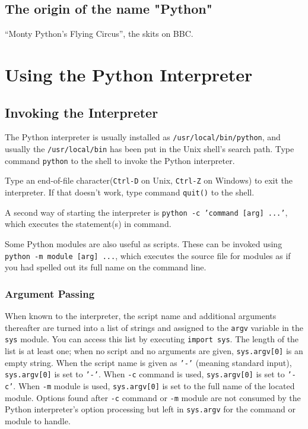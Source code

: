 \documentclass[UTF8]{article}
\begin{document}
\subsection{The origin of the name "Python"}
“Monty Python’s Flying Circus”, the skits on BBC.

\section{Using the Python Interpreter}
\subsection{Invoking the Interpreter}
The Python interpreter is usually installed as \texttt{/usr/local/bin/python}, and usually the
\texttt{/usr/local/bin} has been put in the Unix shell’s search path. Type command \texttt{python}
to the shell to invoke the Python interpreter.

Type an end-of-file character(\texttt{Ctrl-D} on Unix, \texttt{Ctrl-Z} on Windows) to exit the
interpreter. If that doesn’t work, type command \texttt{quit()} to the shell.

A second way of starting the interpreter is \texttt{python -c 'command [arg] ...'},
which executes the statement(s) in command.

Some Python modules are also useful as scripts. These can be invoked using
\texttt{python -m module [arg] ...}, which executes the source file for modules as if you
had spelled out its full name on the command line.

\subsubsection{Argument Passing}
When known to the interpreter, the script name and additional arguments thereafter are turned into
a list of strings and assigned to the \texttt{argv} variable in the \texttt{sys} module. You can
access this list by executing \texttt{import sys}. The length of the list is at least one; when no
script and no arguments are given, \texttt{sys.argv[0]} is an empty string. When the script name is
given as \texttt{'-'} (meaning standard input), \texttt{sys.argv[0]} is set to \texttt{'-'}. When
\texttt{-c} command is used, \texttt{sys.argv[0]} is set to \texttt{'-c'}. When \texttt{-m} module
is used, \texttt{sys.argv[0]} is set to the full name of the located module. Options found after
\texttt{-c} command or \texttt{-m} module are not consumed by the Python interpreter’s option
processing but left in \texttt{sys.argv} for the command or module to handle.
\end{document}
